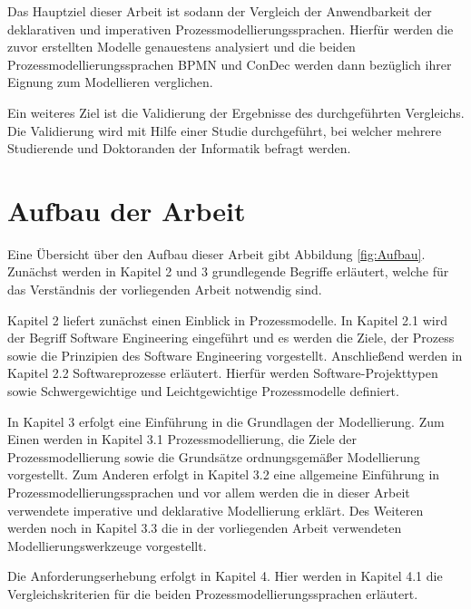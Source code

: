 Das Hauptziel dieser Arbeit ist sodann der Vergleich der Anwendbarkeit der deklarativen und imperativen Prozessmodellierungssprachen. Hierfür werden die zuvor erstellten Modelle genauestens analysiert und die beiden Prozessmodellierungssprachen BPMN und ConDec werden dann bezüglich ihrer Eignung zum Modellieren verglichen.\newline

Ein weiteres Ziel ist die Validierung der Ergebnisse des durchgeführten Vergleichs. Die Validierung wird mit Hilfe einer Studie durchgeführt, bei welcher mehrere Studierende und Doktoranden der Informatik befragt werden.\newline





\section{Aufbau der Arbeit}

Eine Übersicht über den Aufbau dieser Arbeit gibt Abbildung \ref{fig:Aufbau}.
Zunächst werden in Kapitel 2 und 3 grundlegende Begriffe erläutert, welche für das Verständnis der vorliegenden Arbeit notwendig sind.\newline

Kapitel 2 liefert zunächst einen Einblick in Prozessmodelle. In Kapitel 2.1 wird der Begriff Software Engineering eingeführt und es werden die Ziele, der Prozess sowie die Prinzipien des Software Engineering vorgestellt. Anschließend werden in Kapitel 2.2 Softwareprozesse erläutert. Hierfür werden Software-Projekttypen sowie Schwergewichtige und Leichtgewichtige Prozessmodelle definiert.\newline

In Kapitel 3 erfolgt eine Einführung in die Grundlagen der Modellierung. Zum Einen werden in Kapitel 3.1 Prozessmodellierung, die Ziele der Prozessmodellierung sowie die Grundsätze ordnungsgemäßer Modellierung vorgestellt. Zum Anderen erfolgt in Kapitel 3.2 eine allgemeine Einführung in Prozessmodellierungssprachen und vor allem werden die in dieser Arbeit verwendete imperative und deklarative Modellierung erklärt. Des Weiteren werden noch in Kapitel 3.3 die in der vorliegenden Arbeit verwendeten Modellierungswerkzeuge vorgestellt.\newline

Die Anforderungserhebung erfolgt in Kapitel 4. Hier werden in Kapitel 4.1 die Vergleichskriterien für die beiden Prozessmodellierungssprachen erläutert.\newline

